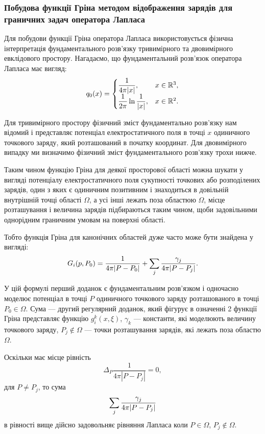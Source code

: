 \subsubsection{Побудова функції Гріна методом відображення зарядів для граничних задач оператора Лапласа}

Для побудови функції Гріна оператора Лапласа використовується фізична інтерпретація фундаментального розв'язку тривимірного та двовимірного евклідового простору. Нагадаємо, що фундаментальний розв'язок оператора Лапласа має вигляд:
\begin{equation}
	q_0(x) = \begin{cases}
		\dfrac{1}{4 \pi |x|}, & x \in \mathbb{R}^3, \\
		\dfrac{1}{2 \pi} \ln \dfrac{1}{|x|}, & x \in \mathbb{R}^2.
	\end{cases}
\end{equation}

Для тривимірного простору фізичний зміст фундаментально розв'язку нам відомий і представляє потенціал електростатичного поля в точці $x$ одиничного точкового заряду, який розташований в початку координат. Для двовимірного випадку ми визначимо фізичний зміст фундаментального розв'язку трохи нижче. \medskip

Таким чином функцію Гріна для деякої просторової області можна шукати у вигляді потенціалу електростатичного поля сукупності точкових або розподілених зарядів, один з яких є одиничним позитивним і знаходиться в довільній внутрішній точці області $\Omega$, а усі інші лежать поза областюю $\Omega$, місце розташування і величина зарядів підбираються таким чином, щоби задовільними однорідним граничним умовам на поверхні області. \medskip

Тобто функція Гріна для канонічних областей дуже часто може бути знайдена у вигляді:
\begin{equation}
	G_i(p, P_0) = \frac{1}{4 \pi |P - P_0|} + \displaystyle\sum\limits_j \frac{\gamma_j}{4 \pi |P - P_j|}.
\end{equation}

У цій формулі перший доданок є фундаментальним розв'язком і одночасно моделює потенціал в точці $P$ одиничного точкового заряду розташованого в точці $P_0 \in \Omega$. Сума --- другий регулярний доданок, який фігурує в означенні 2 функції Гріна представляє функцію  $g_i^k(x, \xi)$, $\gamma_k$ --- константи, які моделюють величину точкового заряду, $P_j \notin \Omega$ --- точки розташування зарядів, які лежать поза областю $\Omega$. \medskip

Оскільки має місце рівність
\begin{equation}
	\Delta_P \frac{1}{4 \pi |P - P_j|} = 0,
\end{equation}
для $P \ne P_j$, то сума
\begin{equation}
	\displaystyle\sum\limits_j \frac{\gamma_j}{4 \pi |P - P_j|}
\end{equation}
в рівності вище дійсно задовольняє рівняння Лапласа коли $P \in \Omega$, $P_j \notin \Omega$.

